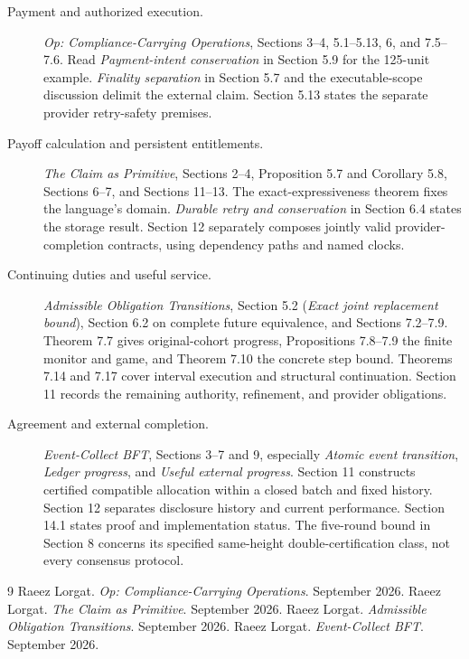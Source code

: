 \documentclass{momentum}
\begin{document}
\begin{description}
\item[Payment and authorized execution.]
\emph{Op: Compliance-Carrying Operations}, Sections 3--4, 5.1--5.13, 6, and 7.5--7.6. Read \emph{Payment-intent conservation} in Section 5.9 for the 125-unit example. \emph{Finality separation} in Section 5.7 and the executable-scope discussion delimit the external claim. Section 5.13 states the separate provider retry-safety premises.

\item[Payoff calculation and persistent entitlements.]
\emph{The Claim as Primitive}, Sections 2--4, Proposition 5.7 and Corollary 5.8, Sections 6--7, and Sections 11--13. The exact-expressiveness theorem fixes the language's domain. \emph{Durable retry and conservation} in Section 6.4 states the storage result. Section 12 separately composes jointly valid provider-completion contracts, using dependency paths and named clocks.

\item[Continuing duties and useful service.]
\emph{Admissible Obligation Transitions}, Section 5.2 (\emph{Exact joint replacement bound}), Section 6.2 on complete future equivalence, and Sections 7.2--7.9. Theorem 7.7 gives original-cohort progress, Propositions 7.8--7.9 the finite monitor and game, and Theorem 7.10 the concrete step bound. Theorems 7.14 and 7.17 cover interval execution and structural continuation. Section 11 records the remaining authority, refinement, and provider obligations.

\item[Agreement and external completion.]
\emph{Event-Collect BFT}, Sections 3--7 and 9, especially \emph{Atomic event transition}, \emph{Ledger progress}, and \emph{Useful external progress}. Section 11 constructs certified compatible allocation within a closed batch and fixed history. Section 12 separates disclosure history and current performance. Section 14.1 states proof and implementation status. The five-round bound in Section 8 concerns its specified same-height double-certification class, not every consensus protocol.
\end{description}

\begin{thebibliography}{9}
 Raeez Lorgat. \emph{Op: Compliance-Carrying Operations}. September 2026.
 Raeez Lorgat. \emph{The Claim as Primitive}. September 2026.
 Raeez Lorgat. \emph{Admissible Obligation Transitions}. September 2026.
 Raeez Lorgat. \emph{Event-Collect BFT}. September 2026.
\end{thebibliography}
\end{document}
